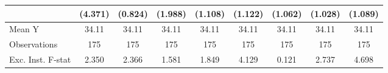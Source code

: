 {\begin{tabular}{l*{8}{c}}
                    &     (4.371)         &     (0.824)         &     (1.988)         &     (1.108)         &     (1.122)         &     (1.062)         &     (1.028)         &     (1.089)         \\
\midrule
Mean Y              &       34.11         &       34.11         &       34.11         &       34.11         &       34.11         &       34.11         &       34.11         &       34.11         \\
Observations        &         175         &         175         &         175         &         175         &         175         &         175         &         175         &         175         \\
Exc. Inst. F-stat   &       2.350         &       2.366         &       1.581         &       1.849         &       4.129         &       0.121         &       2.737         &       4.698         \\
\bottomrule
\end{tabular}
}
